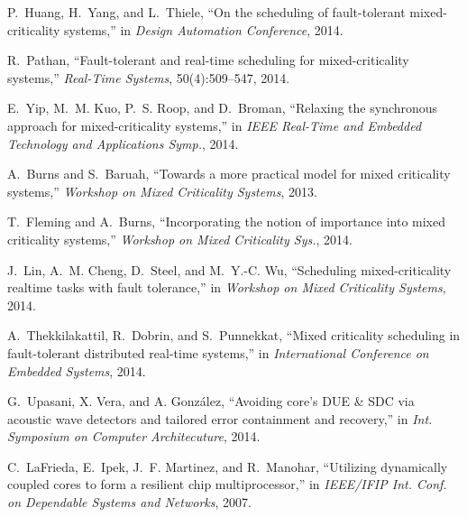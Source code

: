 \documentclass[conference]{IEEEtran}
\begin{document}
\begin{thebibliography}{10}
\vspace{-0.5mm}
P.~Huang, H.~Yang, and L.~Thiele, ``On the scheduling of fault-tolerant
  mixed-criticality systems,'' in \emph{Design Automation Conference}, 2014.

\vspace{-0.5mm}
R.~Pathan, ``Fault-tolerant and real-time scheduling for mixed-criticality systems,''
  \emph{Real-Time Systems}, 50(4):509--547, 2014.

\vspace{-0.5mm}
E.~Yip, M.~M. Kuo, P.~S. Roop, and D.~Broman,
``Relaxing the synchronous
  approach for mixed-criticality systems,'' in \emph{IEEE Real-Time and Embedded
  Technology and Applications Symp.}, 2014.

\vspace{-0.5mm}
A.~Burns and S.~Baruah, ``Towards a more practical model for mixed criticality
  systems,'' \emph{Workshop on Mixed Criticality Systems}, 2013.

\vspace{-0.5mm}
T.~Fleming and A.~Burns, ``Incorporating the notion of importance into mixed
  criticality systems,'' \emph{Workshop on Mixed Criticality  Sys.}, 2014.


\vspace{-0.5mm}
J.~Lin, A.~M. Cheng, D.~Steel, and M.~Y.-C. Wu, ``Scheduling mixed-criticality
  realtime tasks with fault tolerance,'' in \emph{Workshop on Mixed
  Criticality Systems}, 2014.


\vspace{-0.5mm}
A.~Thekkilakattil, R.~Dobrin, and S.~Punnekkat, ``Mixed criticality scheduling
  in fault-tolerant distributed real-time systems,'' in \emph{International Conference on Embedded Systems}, 2014.


\vspace{-0.5mm}
G.~Upasani, X. Vera, and A. Gonz\'{a}lez,
``Avoiding core's DUE \& SDC via acoustic wave detectors and tailored error containment and recovery,''
in \emph{Int. Symposium on Computer Architecuture}, 2014.


\vspace{-0.5mm}
C.~LaFrieda, E.~Ipek, J.~F. Martinez, and R.~Manohar, ``Utilizing dynamically
 coupled cores to form a resilient chip multiprocessor,'' in \emph{IEEE/IFIP Int.
 Conf. on Dependable Systems and Networks}, 2007.




\end{thebibliography}
\end{document}
